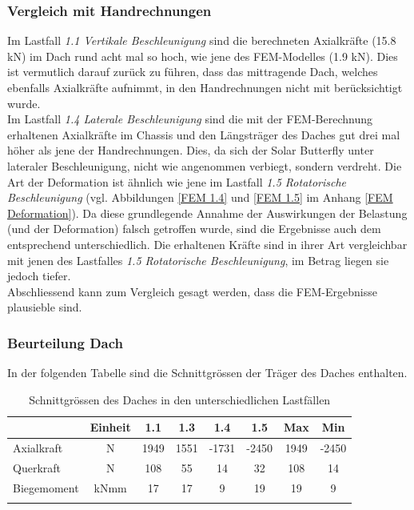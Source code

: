 \subsubsection{Vergleich mit Handrechnungen}
Im Lastfall \emph{1.1 Vertikale Beschleunigung} sind die berechneten Axialkräfte (15.8 kN) im Dach rund acht mal so hoch, wie jene des FEM-Modelles (1.9 kN). Dies ist vermutlich darauf zurück zu führen, dass das mittragende Dach, welches ebenfalls Axialkräfte aufnimmt, in den Handrechnungen nicht mit berücksichtigt wurde.\\
Im Lastfall \emph{1.4 Laterale Beschleunigung} sind die mit der FEM-Berechnung erhaltenen Axialkräfte im Chassis und den Längsträger des Daches gut drei mal höher als jene der Handrechnungen. Dies, da sich der Solar Butterfly unter lateraler Beschleunigung, nicht wie angenommen verbiegt, sondern verdreht. Die Art der Deformation ist ähnlich wie jene im Lastfall \emph{1.5 Rotatorische Beschleunigung} (vgl. Abbildungen \ref{FEM 1.4} und \ref{FEM 1.5} im Anhang \ref{FEM Deformation}). Da diese grundlegende Annahme der Auswirkungen der Belastung (und der Deformation) falsch getroffen wurde, sind die Ergebnisse auch dem entsprechend unterschiedlich. Die erhaltenen Kräfte sind in ihrer Art vergleichbar mit jenen des Lastfalles \emph{1.5 Rotatorische Beschleunigung}, im Betrag liegen sie jedoch tiefer.\\
Abschliessend kann zum Vergleich gesagt werden, dass die FEM-Ergebnisse plausieble sind.

\subsubsection{Beurteilung Dach}
In der folgenden Tabelle sind die Schnittgrössen der Träger des Daches enthalten.

\begin{table}[H]
\centering
\begin{tabular}{lccccccc}
\thickhline
  &	Einheit	&	1.1	&	1.3	&	1.4	&	1.5	&	Max	&	Min	\\	\hline
Axialkraft	&	N	&	1949	&	1551	&	-1731	&	-2450	&	1949	&	-2450	\\
Querkraft	&	N	&	108	&	55	&	14	&	32	&	108	&	14	\\
Biegemoment	&	kNmm	&	17	&	17	&	9	&	19	&	19	&	9	\\	\thickhline
\end{tabular}
\caption{Schnittgrössen des Daches in den unterschiedlichen Lastfällen}
\label{tab:FEMres Dach}
\end{table}


